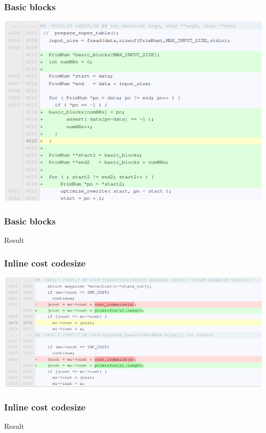 \documentclass{beamer}
\begin{document}
\begin{frame}\frametitle{Basic blocks}
\begin{center}
\includegraphics[scale=0.4]{shots/base_block.png}
\end{center}
\end{frame}

\begin{frame}\frametitle{Basic blocks}
\begin{center}
Result
\end{center}
\end{frame}

\begin{frame}\frametitle{Inline cost codesize}
\begin{center}
\includegraphics[scale=0.4]{shots/ccs_inline.png}
\end{center}
\end{frame}

\begin{frame}\frametitle{Inline cost codesize}
\begin{center}
Result
\end{center}
\end{frame}
\end{document}
